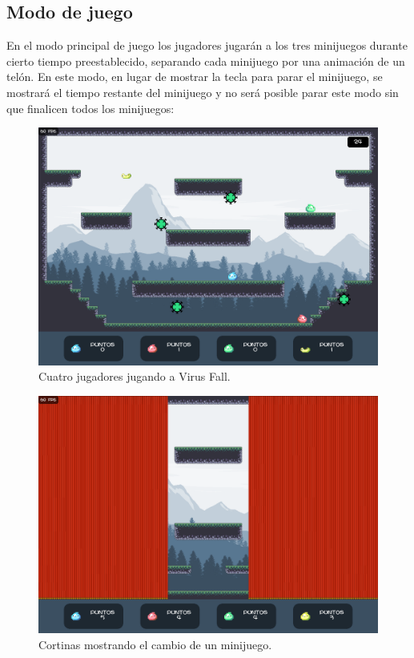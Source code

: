 \documentclass[12pt, spanish]{article}
\begin{document}
\newpage


\subsection{Modo de juego}

En el modo principal de juego los jugadores jugarán a los tres minijuegos durante cierto tiempo preestablecido, separando cada minijuego por una animación de un telón. En este modo, en lugar de mostrar la tecla para parar el minijuego, se mostrará el tiempo restante del minijuego y no será posible parar este modo sin que finalicen todos los minijuegos:

\begin{figure}[H]
	\centering
	\includegraphics[width=\textwidth]{"modos/virus_play_state.png"}
	\caption{Cuatro jugadores jugando a Virus Fall.}\label{figure:virus_play_state}
\end{figure}

\begin{figure}[H]
	\centering
	\includegraphics[width=\textwidth]{"modos/cortinas_cambio_minijuego.png"}
	\caption{Cortinas mostrando el cambio de un minijuego.}\label{figure:cortinas_cambio_minijuego}
\end{figure}
\end{document}
